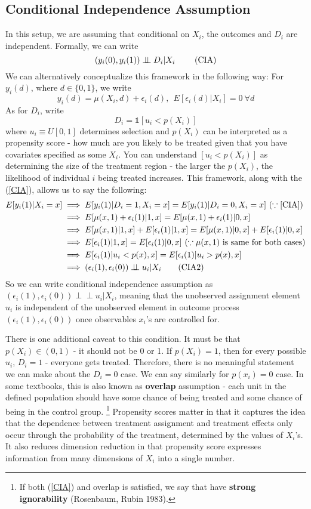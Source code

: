 \documentclass[12pt]{article}
\theoremstyle{definition}
\theoremstyle{property}
\theoremstyle{assumption}
\theoremstyle{example}
\theoremstyle{comment}
\begin{document}
\subsection{Conditional Independence Assumption}
In this setup, we are assuming that conditional on $X_i$, the outcomes and $D_i$ are independent. Formally, we can write
\[
 (y_i(0), y_i(1)) \perp \!\!\! \perp D_i|X_i \ \tag{\text{CIA}}\label{CIA}
\]
We can alternatively conceptualize this framework in the following way: For $y_i(d)$, where $d\in \{0,1\}$, we write
\[
y_i(d)=\mu(X_i,d)+\epsilon_i(d),  \ \ E[\epsilon_i(d)|X_i]=0  \ \forall d
\]
As for $D_i$, write
\[
D_i = \mathbb{1}[u_i<p(X_i)]
\]
where $u_i\equiv U[0,1]$ determines selection and $p(X_i)$ can be interpreted as a propensity score - how much are you likely to be treated given that you have covariates specified as some $X_i$. You can understand $[u_i<p(X_i)]$ as determining the size of the treatment region - the larger the $p(X_i)$, the likelihood of individual $i$ being treated increases. This framework, along with the (\ref{CIA}), allows us to say the following: 
\small{\begin{align*}
E[y_i(1)|X_i=x]&\implies E[y_i(1)|D_i=1,X_i=x]=E[y_i(1)|D_i=0,X_i=x] \ (\because \ref{CIA})\\
&\implies E[\mu(x,1)+\epsilon_i(1)|1,x]=E[\mu(x,1)+\epsilon_i(1)|0,x]\\
&\implies E[\mu(x,1)|1,x]+E[\epsilon_i(1)|1,x]=E[\mu(x,1)|0,x]+E[\epsilon_i(1)|0,x]\\
&\implies E[\epsilon_i(1)|1,x]=E[\epsilon_i(1)|0,x]\ (\because \mu(x,1)\text{ is same for both cases})\\
&\implies E[\epsilon_i(1)|u_i<p(x),x]=E[\epsilon_i(1)|u_i>p(x),x]\\
&\implies (\epsilon_i(1), \epsilon_i(0))\perp \!\!\! \perp u_i|X_i \tag{\text{CIA2}}\label{CIA2}
\end{align*}}\normalsize
So we can write conditional independence assumption as $ (\epsilon_i(1), \epsilon_i(0))\perp \!\!\! \perp u_i|X_i $, meaning that the unobserved assignment element $u_i$ is independent of the unobserved element in outcome process $(\epsilon_i(1), \epsilon_i(0))$ once observables $x_i$'s are controlled for. 
\par
There is one additional caveat to this condition. It must be that $p(X_i)\in(0,1)$ - it should not be 0 or 1.  If $p(X_i)=1$, then for every possible $u_i$, $D_i=1$ - everyone gets treated. Therefore, there is no meaningful statement we can make about the $D_i=0$ case. We can say similarly for $p(x_i)=0$ case. In some textbooks, this is also known as \textbf{overlap} assumption - each unit in the defined population should have some chance of being treated and some chance of being in the control group. \footnote{If both (\ref{CIA}) and overlap is satisfied, we say that have \textbf{strong ignorability} (Rosenbaum, Rubin 1983).} Propensity scores matter in that it captures the idea that the dependence between treatment assignment and treatment effects only occur through the probability of the treatment, determined by the values of $X_i$'s. It also reduces dimension reduction in that propensity score expresses information from many dimensions of $X_i$ into a single number.\par
\end{document}
